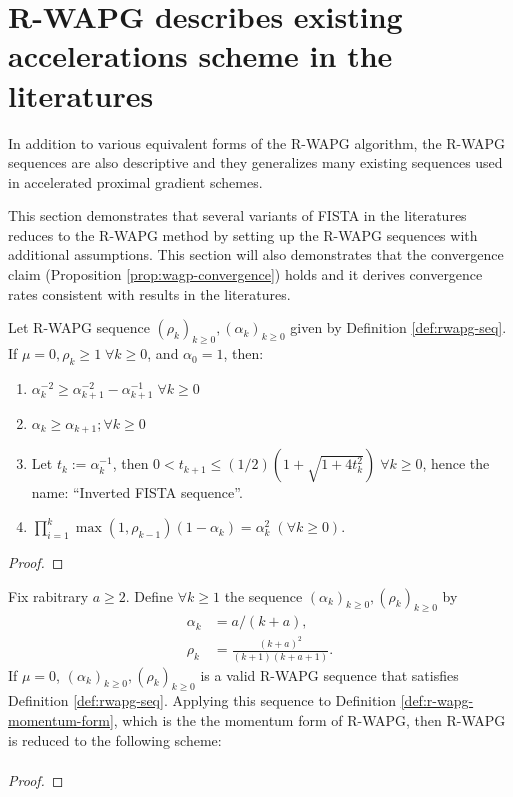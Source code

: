\documentclass[12pt]{article}
\begin{document}
\section{R-WAPG describes existing accelerations scheme in the literatures}
    In addition to various equivalent forms of the R-WAPG algorithm, the R-WAPG sequences are also descriptive and they generalizes many existing sequences used in accelerated proximal gradient schemes. 
    \par
    This section demonstrates that several variants of FISTA in the literatures reduces to the R-WAPG method by setting up the R-WAPG sequences with additional assumptions. 
    This section will also demonstrates that the convergence claim (Proposition \ref{prop:wagp-convergence}) holds and it derives convergence rates consistent with results in the literatures.  
    \begin{lemma}
        Let R-WAPG sequence $(\rho_k)_{k \ge 0}, (\alpha_k)_{k \ge 0}$ given by Definition \ref{def:rwapg-seq}. 
        If $\mu = 0, \rho_k \ge 1\; \forall k \ge 0$, and $\alpha_0 = 1$, then: 
        \begin{enumerate}
            \item $\alpha_k^{-2} \ge \alpha_{k + 1}^{-2} - \alpha_{k + 1}^{-1}\; \forall k \ge 0$
            \item $\alpha_k \ge \alpha_{k + 1}; \forall k \ge 0$
            \item Let $t_k := \alpha_k^{-1}$, then $0 < t_{k + 1} \le (1/2)\left(1 + \sqrt{1 + 4t_k^2}\right)\;\forall k\ge 0$, hence the name: ``Inverted FISTA sequence''. 
            \item $\prod_{i = 1}^k\max(1, \rho_{k - 1})(1 - \alpha_k) = \alpha_k^2 \;(\forall k \ge 0)$. 
        \end{enumerate}
    \end{lemma}
    \begin{proof}
        
    \end{proof}

    \begin{lemma}
        Fix rabitrary $a \ge 2$.
        Define $\forall k \ge 1$ the sequence $(\alpha_k)_{k \ge 0}, (\rho_k)_{k \ge 0}$ by 
        \begin{align*}
            \alpha_k &= a/(k + a), 
            \\
            \rho_k &= \frac{(k + a)^2}{(k + 1)(k + a + 1)}. 
        \end{align*}
        If $\mu = 0$, $(\alpha_k)_{k \ge 0}, (\rho_k)_{k \ge 0}$ is a valid R-WAPG sequence that satisfies Definition \ref{def:rwapg-seq}. 
        Applying this sequence to Definition \ref{def:r-wapg-momentum-form}, which is the the momentum form of R-WAPG, then R-WAPG is reduced to the following scheme: 
        \begin{align*}
        \end{align*}
    \end{lemma}
    \begin{proof}
        

    \end{proof}
\end{document}
